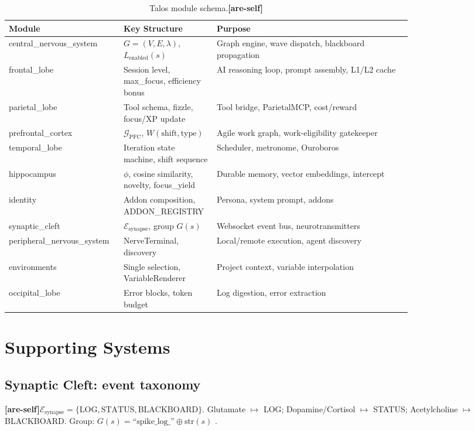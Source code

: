 \documentclass[11pt]{article}
\newcommand{\areself}{\textbf{[are-self]}}
\begin{document}
	\begin{table}[t]
		\centering
		\caption{Talos module schema.\areself}
		\label{tab:talos-modules}
		\footnotesize
		\begin{tabular}{@{}p{0.20\linewidth}p{0.15\linewidth}>{\raggedright\arraybackslash}p{0.45\linewidth}@{}}
			\toprule
			\textbf{Module} & \textbf{Key Structure} & \textbf{Purpose} \\
			\midrule
			central\_nervous\_system & $G=(V,E,\lambda)$, $L_{\text{enabled}}(s)$ & Graph engine, wave dispatch, blackboard propagation \\
			frontal\_lobe & Session level, max\_focus, efficiency bonus & AI reasoning loop, prompt assembly, L1/L2 cache \\
			parietal\_lobe & Tool schema, fizzle, focus/XP update & Tool bridge, ParietalMCP, cost/reward \\
			prefrontal\_cortex & $\mathcal{G}_{\text{PFC}}$, $W(\text{shift}, \text{type})$ & Agile work graph, work-eligibility gatekeeper \\
			temporal\_lobe & Iteration state machine, shift sequence & Scheduler, metronome, Ouroboros \\
			hippocampus & $\phi$, cosine similarity, novelty, focus\_yield & Durable memory, vector embeddings, intercept \\
			identity & Addon composition, ADDON\_REGISTRY & Persona, system prompt, addons \\
			synaptic\_cleft & $\mathcal{E}_{\text{synapse}}$, group $G(s)$ & Websocket event bus, neurotransmitters \\
			peripheral\_nervous\_system & NerveTerminal, discovery & Local/remote execution, agent discovery \\
			environments & Single selection, VariableRenderer & Project context, variable interpolation \\
			occipital\_lobe & Error blocks, token budget & Log digestion, error extraction \\
			\bottomrule
		\end{tabular}
	\end{table}
	
	\section{Supporting Systems}
	\label{are-self:supporting}
	\subsection{Synaptic Cleft: event taxonomy}
	\areself $\mathcal{E}_{\text{synapse}} = \{\text{LOG}, \text{STATUS}, \text{BLACKBOARD}\}$. Glutamate $\mapsto$ LOG; Dopamine/Cortisol $\mapsto$ STATUS; Acetylcholine $\mapsto$ BLACKBOARD. Group: $G(s) = \text{``spike\_log\_''} \oplus \text{str}(s)$ \cite{talosSynaptic,talosCombined}.
	
\end{document}

